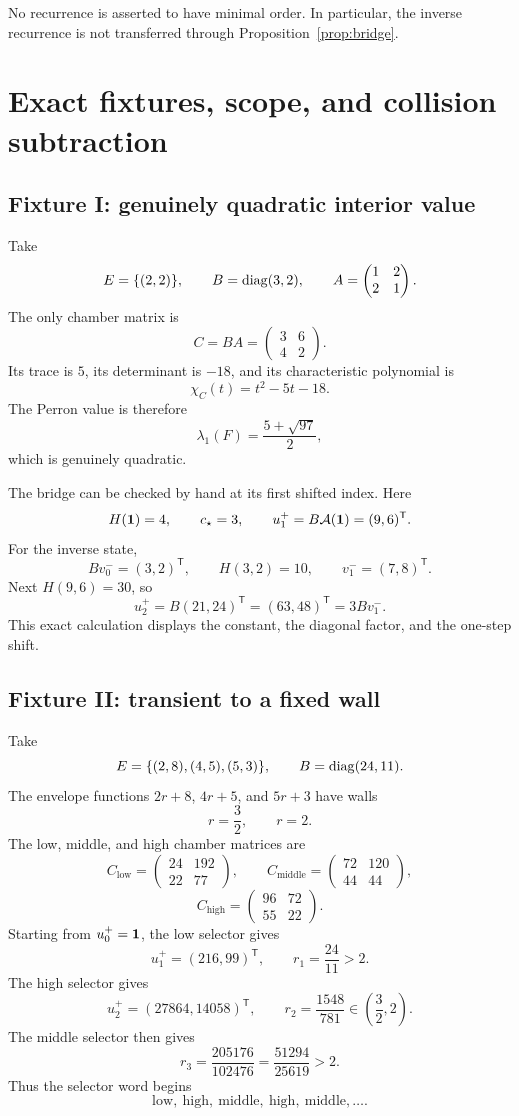 \documentclass[11pt]{article}
\theoremstyle{definition}
\theoremstyle{remark}
\begin{document}
No recurrence is asserted to have minimal order.  In particular, the
inverse recurrence is not transferred through
Proposition~\ref{prop:bridge}.

\section{Exact fixtures, scope, and collision subtraction}

\subsection{Fixture I: genuinely quadratic interior value}

Take
\[
E=\{(2,2)\},\qquad B=\operatorname{diag}(3,2),\qquad
A=\begin{pmatrix}1&2\\2&1\end{pmatrix}.
\]
The only chamber matrix is
\[
C=BA=\begin{pmatrix}3&6\\4&2\end{pmatrix}.
\]
Its trace is \(5\), its determinant is \(-18\), and its characteristic
polynomial is
\[
\chi_C(t)=t^2-5t-18.
\]
The Perron value is therefore
\[
\lambda_1(F)=\frac{5+\sqrt{97}}2,
\]
which is genuinely quadratic.

The bridge can be checked by hand at its first shifted index.  Here
\[
H(\mathbf{1})=4,\qquad c_\star=3,\qquad
u_1^+=B\mathcal{A}(\mathbf{1})=(9,6)^{\mathsf T}.
\]
For the inverse state,
\[
Bv_0^-=(3,2)^{\mathsf T},\qquad
H(3,2)=10,\qquad
v_1^-=(7,8)^{\mathsf T}.
\]
Next \(H(9,6)=30\), so
\[
u_2^+=B(21,24)^{\mathsf T}
=(63,48)^{\mathsf T}
=3Bv_1^-.
\]
This exact calculation displays the constant, the diagonal factor, and
the one-step shift.

\subsection{Fixture II: transient to a fixed wall}

Take
\[
E=\{(2,8),(4,5),(5,3)\},\qquad B=\operatorname{diag}(24,11).
\]
The envelope functions \(2r+8\), \(4r+5\), and \(5r+3\) have walls
\[
r=\frac32,\qquad r=2.
\]
The low, middle, and high chamber matrices are
\[
C_{\mathrm{low}}=
\begin{pmatrix}24&192\\22&77\end{pmatrix},\qquad
C_{\mathrm{middle}}=
\begin{pmatrix}72&120\\44&44\end{pmatrix},
\]
\[
C_{\mathrm{high}}=
\begin{pmatrix}96&72\\55&22\end{pmatrix}.
\]
Starting from \(u_0^+=\mathbf{1}\), the low selector gives
\[
u_1^+=(216,99)^{\mathsf T},\qquad r_1=\frac{24}{11}>2.
\]
The high selector gives
\[
u_2^+=(27864,14058)^{\mathsf T},\qquad
r_2=\frac{1548}{781}\in\left(\frac32,2\right).
\]
The middle selector then gives
\[
r_3=\frac{205176}{102476}
=\frac{51294}{25619}>2.
\]
Thus the selector word begins
\[
\mathrm{low},\ \mathrm{high},\ \mathrm{middle},\
\mathrm{high},\ \mathrm{middle},\ldots.
\]
\end{document}
